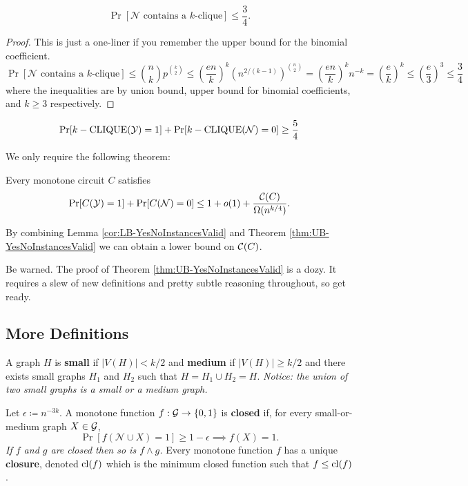 \documentclass[11pt]{article}
\begin{document}
	\begin{lemma}
		\label{lem:UB-NoInstanceContainsKClique}
		\[\Pr[\mathcal{N} \mbox{ contains a $k$-clique}] \leq \frac{3}{4}.\]
	\end{lemma}
	\begin{proof}
		This is just a one-liner if you remember the upper bound for the binomial coefficient.
		\[\Pr[\mathcal{N} \mbox{ contains a $k$-clique}] \leq \binom{n}{k}p^{\binom{k}{2}} \leq \left(\frac{en}{k}\right)^k \left(n^{2/(k-1)}\right)^{\binom{n}{2}} = \left(\frac{en}{k}\right)^kn^{-k} = \left(\frac{e}{k}\right)^k \leq \left(\frac{e}{3}\right)^3\leq \frac{3}{4}\]
		where the inequalities are by union bound, upper bound for binomial coefficients, and $k \geq 3$ respectively.
	\end{proof}

	\begin{corollary}
		\label{cor:LB-YesNoInstancesValid}
		\[\Pr[k-\mathrm{CLIQUE}(\mathcal{Y}) = 1] + \Pr[k-\mathrm{CLIQUE}(\mathcal{N}) = 0] \geq \frac{5}{4}\]
	\end{corollary}

	We only require the following theorem:
	\begin{theorem}
		\label{thm:UB-YesNoInstancesValid}
		Every monotone circuit $C$ satisfies
		\[\Pr[C(\mathcal{Y}) = 1] + \Pr[C(\mathcal{N}) = 0] \leq 1 + o(1) + \frac{\mathcal{C}(C)}{\Omega(n^{k/4})}.\]
	\end{theorem}
	
	By combining Lemma \ref{cor:LB-YesNoInstancesValid} and Theorem \ref{thm:UB-YesNoInstancesValid} we can obtain a lower bound on $\mathcal{C}(C)$. 
	 
	Be warned. The proof of Theorem \ref{thm:UB-YesNoInstancesValid} is a dozy. It requires a slew of new definitions and pretty subtle reasoning throughout, so get ready. 
	 
	\subsection{More Definitions}
	A graph $H$ is \textbf{small} if $|V(H)| < k/2$ and \textbf{medium} if $|V(H)| \geq k/2$ and there exists small graphs $H_1$ and $H_2$ such that $H = H_1 \cup H_2 = H$. \emph{Notice: the union of two small graphs is a small or a medium graph.}
	 
	Let $\epsilon \coloneqq n^{-3k}$. A monotone function $f: \mathcal{G} \rightarrow \{0,1\}$ is \textbf{closed} if, for every small-or-medium graph $X \in \mathcal{G}$, 
	\[\Pr[f(\mathcal{N} \cup X) = 1] \geq 1 - \epsilon \implies f(X) = 1.\]
	\emph{If $f$ and $g$ are closed then so is $f \land g$.} Every monotone function $f$ has a unique \textbf{closure}, denoted $\mathrm{cl}(f)$ which is the minimum closed function such that $f \leq \mathrm{cl}(f)$. 
	 
\end{document}
